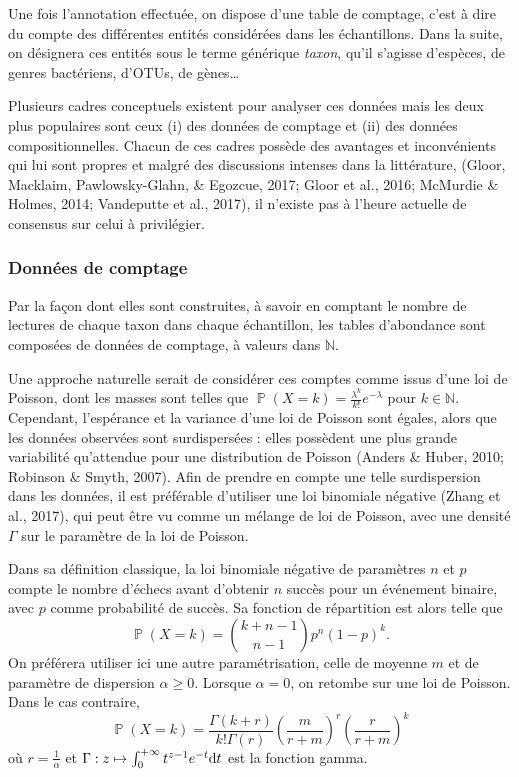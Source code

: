 \documentclass[12pt,a4paper]{reedthesis}
\newcommand \NN {\mathbb{N}}
\newcommand \dx [2] [] {\mathrm{d}^{#1}\mspace{-1mu}\mathord{#2}}
\DeclareMathOperator*{\prob}{\mathbb{P}}
\newcommand \PP [1]{\prob\left({#1}\right)}
\theoremstyle{definition}
\theoremstyle{definition}
\theoremstyle{definition}
\theoremstyle{remark}
\begin{document}
Une fois l'annotation effectuée, on dispose d'une table de comptage, c'est à dire du compte des différentes entités considérées dans les échantillons. Dans la suite, on désignera ces entités sous le terme générique \emph{taxon}, qu'il s'agisse d'espèces, de genres bactériens, d'OTUs, de gènes\ldots{}

Plusieurs cadres conceptuels existent pour analyser ces données mais les deux plus populaires sont ceux (i) des données de comptage et (ii) des données compositionnelles. Chacun de ces cadres possède des avantages et inconvénients qui lui sont propres et malgré des discussions intenses dans la littérature, (Gloor, Macklaim, Pawlowsky-Glahn, \& Egozcue, 2017; Gloor et al., 2016; McMurdie \& Holmes, 2014; Vandeputte et al., 2017), il n'existe pas à l'heure actuelle de consensus sur celui à privilégier.

\hypertarget{donnuxe9es-de-comptage}{%
\subsubsection*{Données de comptage}\label{donnuxe9es-de-comptage}}

Par la façon dont elles sont construites, à savoir en comptant le nombre de lectures de chaque taxon dans chaque échantillon, les tables d'abondance sont composées de données de comptage, à valeurs dans \(\NN\).

Une approche naturelle serait de considérer ces comptes comme issus d'une loi de Poisson, dont les masses sont telles que \(\PP{X = k} = \frac{\lambda^k}{k!}e^{-\lambda}\) pour \(k \in \NN\). Cependant, l'espérance et la variance d'une loi de Poisson sont égales, alors que les données observées sont surdispersées : elles possèdent une plus grande variabilité qu'attendue pour une distribution de Poisson (Anders \& Huber, 2010; Robinson \& Smyth, 2007). Afin de prendre en compte une telle surdispersion dans les données, il est préférable d'utiliser une loi binomiale négative (Zhang et al., 2017), qui peut être vu comme un mélange de loi de Poisson, avec une densité \(\Gamma\) sur le paramètre de la loi de Poisson.

Dans sa définition classique, la loi binomiale négative de paramètres \(n\) et \(p\) compte le nombre d'échecs avant d'obtenir \(n\) succès pour un événement binaire, avec \(p\) comme probabilité de succès. Sa fonction de répartition est alors telle que
\begin{equation*}
\PP{X = k} = \binom{k+n-1}{n-1} p^n(1-p)^k.
\end{equation*}
On préférera utiliser ici une autre paramétrisation, celle de moyenne \(m\) et de paramètre de dispersion \(\alpha \geq 0\). Lorsque \(\alpha = 0\), on retombe sur une loi de Poisson. Dans le cas contraire,
\begin{equation*}
\PP{X = k} = \frac{\Gamma(k+r)}{k!\Gamma(r)}\left(\frac{m}{r+m}\right)^r\left(\frac{r}{r+m}\right)^k
\end{equation*}
où \(r=\frac{1}{\alpha}\) et \(\Gamma : z \mapsto \int_0^{+\infty}t^{z-1}e^{-t}\dx{t}\) est la fonction gamma.
\end{document}
